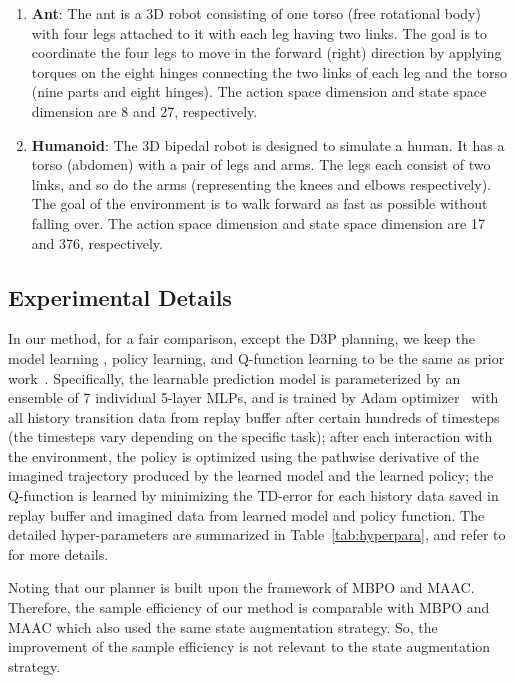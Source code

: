 \documentclass{article} %
\newcommand{\yue}[1]{ {#1}}
\newcommand{\revision}[1]{{#1}}
\begin{document}
{\begin{enumerate}
    \item {\bf Ant}: The ant is a 3D robot consisting of one torso (free rotational body) with four legs attached to it with each leg having two links. The goal is to coordinate the four legs to move in the forward (right) direction by applying torques on the eight hinges connecting the two links of each leg and the torso (nine parts and eight hinges). The action space dimension and state space dimension are 8 and 27, respectively.
    \item {\bf Humanoid}: The 3D bipedal robot is designed to simulate a human. It has a torso (abdomen) with a pair of legs and arms. The legs each consist of two links, and so do the arms (representing the knees and elbows respectively). The goal of the environment is to walk forward as fast as possible without falling over. The action space dimension and state space dimension are 17 and 376, respectively.
\end{enumerate}}

\subsection{\revision{Experimental Details}}\label{sec:hyperpara}
\revision{In our method, for a fair comparison, except the D3P planning, we keep the model learning , policy learning, and Q-function learning to be the same as prior work~\citep{janner_when_2019,clavera_model-augmented_2019}. Specifically, the learnable prediction model is parameterized by an ensemble of 7 individual 5-layer MLPs, and is trained by Adam optimizer~\citep{kingma2014adam} with all history transition data from replay buffer after certain hundreds of timesteps (the timesteps vary depending on the specific task); after each interaction with the environment, the policy is optimized using the pathwise derivative of the imagined trajectory produced by the learned model and the learned policy; the Q-function is learned by minimizing the TD-error for each history data saved in replay buffer and imagined data from learned model and policy function. The detailed hyper-parameters are summarized in Table~\ref{tab:hyperpara}, and refer to \citet{janner_when_2019,clavera_model-augmented_2019} for more details.}

\yue{Noting that our planner is built upon the framework of MBPO and MAAC. Therefore, the sample efficiency of our method is comparable with MBPO and MAAC which also used the same state augmentation strategy.  So, the improvement of the sample efficiency is not relevant to the state augmentation strategy.}
\end{document}
